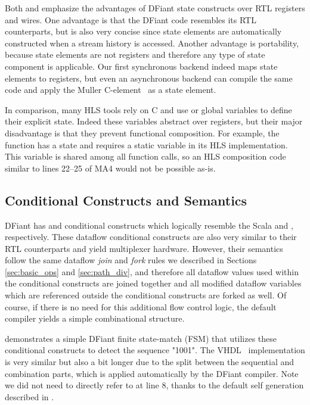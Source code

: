 Both  and  emphasize the advantages of DFiant state constructs over RTL registers and wires.
One advantage is that the DFiant code resembles its RTL counterparts, but is also very concise since state elements are automatically constructed when a stream history is accessed. Another advantage is portability, because state elements are not registers and therefore any type of state component is applicable. Our first synchronous backend indeed maps state elements to registers, but even an asynchronous backend can compile the same code and apply the Muller C-element~\cite{muller1957theory} as a state element. 

In comparison, many HLS tools rely on C and use  or global variables to define their explicit state. Indeed these variables abstract over registers, but their major disadvantage is that they prevent functional composition. For example, the  function has a state and requires a static variable in its HLS implementation. This variable is shared among all  function calls, so an HLS composition code similar to lines 22--25 of MA4 would not be possible as-is.

\subsection{Conditional Constructs and Semantics}
\label{sec:conditional}
DFiant has  and  conditional constructs which logically resemble the Scala  and , respectively. These dataflow conditional constructs are also very similar to their RTL counterparts and yield multiplexer hardware. However, their semantics follow the same dataflow \emph{join} and \emph{fork} rules we described in Sections \ref{sec:basic_ops} and \ref{sec:path_div}, and therefore all dataflow values used within the conditional constructs are joined together and all modified dataflow variables which are referenced outside the conditional constructs are forked as well. Of course, if there is no need for this additional flow control logic, the default compiler yields a simple combinational structure.

 demonstrates a simple DFiant finite state-match (FSM) that utilizes these conditional constructs to detect the sequence "1001". The VHDL~\cite{seqdetvhdl} implementation is very similar but also a bit longer due to the split between the sequential and combination parts, which is applied automatically by the DFiant compiler.
Note we did not need to directly refer to  at line 8, thanks to the default self generation described in .

